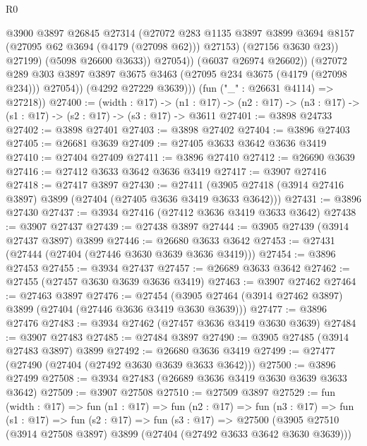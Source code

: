 \begin{lexlean}{R0}
\begin{coremodule}
                        @3900
                        @3897
                        @26845
                        @27314
                        (@27072
                          @283
                          @1135
                          @3897
                          @3899
                          @3694
                          @8157
                          (@27095 @62 @3694 (@4179 (@27098 @62)))
                          @27153)
                        (@27156 @3630 @23))
                      @27199)
                    (@5098 @26600 @3633))
                  @27054))
              (@6037 @26974 @26602))
            (@27072
              @289
              @303
              @3897
              @3897
              @3675
              @3463
              (@27095 @234 @3675 (@4179 (@27098 @234)))
              @27054))
          (@4292 @27229 @3639)))
      (fun ("_" : @26631 @4114) => @27218))
@27400 := (width : @17) ->
  (n1 : @17) -> (n2 : @17) -> (n3 : @17) -> (s1 : @17) -> (s2 : @17) -> (s3 : @17) -> @3611
@27401 := @3898 @24733
@27402 := @3898 @27401
@27403 := @3898 @27402
@27404 := @3896 @27403
@27405 := @26681 @3639
@27409 := @27405 @3633 @3642 @3636 @3419
@27410 := @27404 @27409
@27411 := @3896 @27410
@27412 := @26690 @3639
@27416 := @27412 @3633 @3642 @3636 @3419
@27417 := @3907 @27416
@27418 := @27417 @3897
@27430 := @27411 (@3905 @27418 (@3914 @27416 @3897) @3899 (@27404 (@27405 @3636 @3419 @3633 @3642)))
@27431 := @3896 @27430
@27437 := @3934 @27416 (@27412 @3636 @3419 @3633 @3642)
@27438 := @3907 @27437
@27439 := @27438 @3897
@27444 := @3905 @27439 (@3914 @27437 @3897) @3899
@27446 := @26680 @3633 @3642
@27453 := @27431 (@27444 (@27404 (@27446 @3630 @3639 @3636 @3419)))
@27454 := @3896 @27453
@27455 := @3934 @27437
@27457 := @26689 @3633 @3642
@27462 := @27455 (@27457 @3630 @3639 @3636 @3419)
@27463 := @3907 @27462
@27464 := @27463 @3897
@27476 := @27454 (@3905 @27464 (@3914 @27462 @3897) @3899 (@27404 (@27446 @3636 @3419 @3630 @3639)))
@27477 := @3896 @27476
@27483 := @3934 @27462 (@27457 @3636 @3419 @3630 @3639)
@27484 := @3907 @27483
@27485 := @27484 @3897
@27490 := @3905 @27485 (@3914 @27483 @3897) @3899
@27492 := @26680 @3636 @3419
@27499 := @27477 (@27490 (@27404 (@27492 @3630 @3639 @3633 @3642)))
@27500 := @3896 @27499
@27508 := @3934 @27483 (@26689 @3636 @3419 @3630 @3639 @3633 @3642)
@27509 := @3907 @27508
@27510 := @27509 @3897
@27529 := fun (width : @17) =>
  fun (n1 : @17) =>
  fun (n2 : @17) =>
  fun (n3 : @17) =>
  fun (s1 : @17) =>
  fun (s2 : @17) =>
  fun (s3 : @17) =>
  @27500 (@3905 @27510 (@3914 @27508 @3897) @3899 (@27404 (@27492 @3633 @3642 @3630 @3639)))

\end{coremodule}
\end{lexlean}
